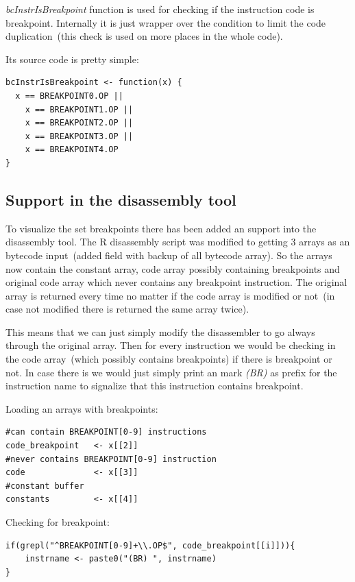 \documentclass[thesis=M,english]{FITthesis}[2018/10/20]
\begin{document}
\textit{bcInstrIsBreakpoint} function is used for checking if the instruction code is breakpoint. Internally it is just wrapper over the condition to limit the code duplication~(this check is used on more places in the whole code).

Its source code is pretty simple:

\begin{lstlisting}
bcInstrIsBreakpoint <- function(x) {
  x == BREAKPOINT0.OP ||
    x == BREAKPOINT1.OP ||
    x == BREAKPOINT2.OP ||
    x == BREAKPOINT3.OP ||
    x == BREAKPOINT4.OP
}
\end{lstlisting}

\subsection{Support in the disassembly tool}\label{debugger-support-in-disassembly}

To visualize the set breakpoints there has been added an support into the disassembly tool. The R disassembly script was modified to getting 3 arrays as an bytecode input~(added field with backup of all bytecode array). So the arrays now contain the constant array, code array possibly containing breakpoints and original code array which never contains any breakpoint instruction. The original array is returned every time no matter if the code array is modified or not~(in case not modified there is returned the same array twice). 

This means that we can just simply modify the disassembler to go always through the original array. Then for every instruction we would be checking in the code array~(which possibly contains breakpoints) if there is breakpoint or not. In case there is we would just simply print an mark \textit{(BR)} as prefix for the instruction name to signalize that this instruction contains breakpoint.

Loading an arrays with breakpoints:
\begin{lstlisting}
#can contain BREAKPOINT[0-9] instructions
code_breakpoint   <- x[[2]]
#never contains BREAKPOINT[0-9] instruction
code              <- x[[3]]
#constant buffer
constants         <- x[[4]]
\end{lstlisting}


Checking for breakpoint:
\begin{lstlisting}
if(grepl("^BREAKPOINT[0-9]+\\.OP$", code_breakpoint[[i]])){
    instrname <- paste0("(BR) ", instrname)
}
\end{lstlisting}
\end{document}
